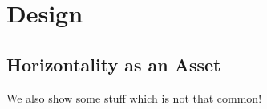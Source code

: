
%

\chapter{Design}
\label{cha:design}

\glsresetall

\section{Horizontality as an Asset}
\label{sec:horizontality_asset}

We also show some stuff which is not that common!
